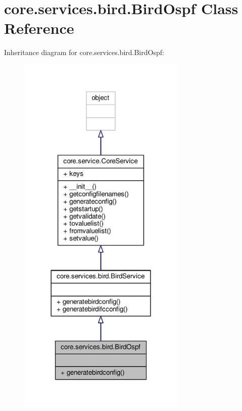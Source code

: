 \hypertarget{classcore_1_1services_1_1bird_1_1_bird_ospf}{\section{core.\+services.\+bird.\+Bird\+Ospf Class Reference}
\label{classcore_1_1services_1_1bird_1_1_bird_ospf}
}


Inheritance diagram for core.\+services.\+bird.\+Bird\+Ospf\+:
\nopagebreak
\begin{figure}[H]
\begin{center}
\leavevmode
\includegraphics[width=227pt]{classcore_1_1services_1_1bird_1_1_bird_ospf__inherit__graph}
\end{center}
\end{figure}


